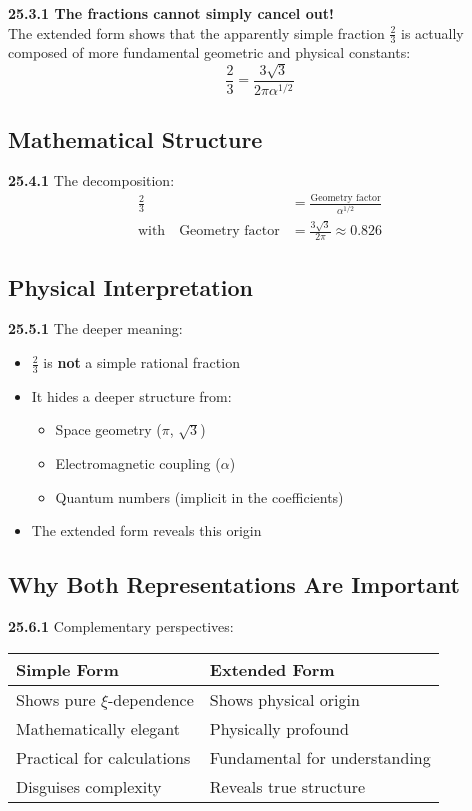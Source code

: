 \documentclass[12pt,a4paper]{article}
\begin{document}
\begin{tcolorbox}[colback=red!5!white,colframe=red!75!black]
	\textbf{25.3.1 The fractions cannot simply cancel out!}
	\\
	The extended form shows that the apparently simple fraction $\frac{2}{3}$ is actually composed of more fundamental geometric and physical constants:
	\[
	\frac{2}{3} = \frac{3\sqrt{3}}{2\pi\alpha^{1/2}}
	\]
\end{tcolorbox}

\subsection{Mathematical Structure}

\noindent \textbf{25.4.1} The decomposition:
\begin{align*}
	\frac{2}{3} &= \frac{\text{Geometry factor}}{\alpha^{1/2}} \\
	\text{with} \quad \text{Geometry factor} &= \frac{3\sqrt{3}}{2\pi} \approx 0.826
\end{align*}

\subsection{Physical Interpretation}

\noindent \textbf{25.5.1} The deeper meaning:
\begin{itemize}
	\item $\frac{2}{3}$ is \textbf{not} a simple rational fraction
	\item It hides a deeper structure from:
	\begin{itemize}
		\item Space geometry ($\pi$, $\sqrt{3}$)
		\item Electromagnetic coupling ($\alpha$)
		\item Quantum numbers (implicit in the coefficients)
	\end{itemize}
	\item The extended form reveals this origin
\end{itemize}

\subsection{Why Both Representations Are Important}

\noindent \textbf{25.6.1} Complementary perspectives:

\begin{tabular}{p{}p{}}
	\textbf{Simple Form} & \textbf{Extended Form} \\
	\hline
	Shows pure $\xi$-dependence & Shows physical origin \\
	Mathematically elegant & Physically profound \\
	Practical for calculations & Fundamental for understanding \\
	Disguises complexity & Reveals true structure \\
\end{tabular}
\end{document}
